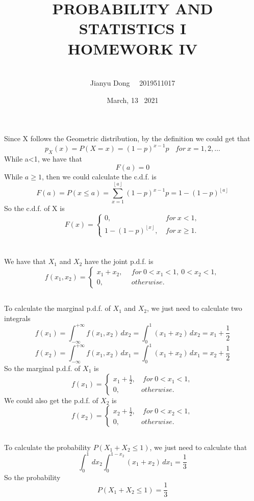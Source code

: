 \documentclass[10.5pt]{article}
\title{PROBABILITY AND STATISTICS I
\\HOMEWORK IV}
\author{\\Jianyu Dong   ~~2019511017}
\date{March, 13~ 2021}
\begin{document}
\maketitle
\newpage

\section{}
Since X follows the Geometric distribution, by the definition we could get that $$p_X(x) = P(X=x) = \left(1-p\right)^{x-1}p ~~~~for~x=1,2,\dots$$\indent
While a<1, we have that $$F(a) = 0$$\indent
While $a\geqslant 1$, then we could calculate the c.d.f. is $$F(a) = P(x\leqslant a) = \sum_{x=1}^{\left\lfloor a\right\rfloor } \left(1-p\right)^{x-1}p = 1-\left(1-p\right)^{\left\lfloor a\right\rfloor} $$\indent
So the c.d.f. of X is $$F(x) = \begin{cases}
    0, & ~for ~x<1,\\
    1-\left(1-p\right)^{\left\lfloor x\right\rfloor }, & ~for ~x\geqslant 1.
\end{cases}$$

\section{}
We have that $X_1$ and $X_2$ have the joint p.d.f. is $$f(x_1,x_2) = \begin{cases}
    x_1 + x_2,&~~for ~0<x_1<1,~0<x_2<1,\\
    0,&~~otherwise.
\end{cases}$$
\subsection{}
To calculate the marginal p.d.f. of $X_1$ and $X_2$, we just need to calculate two integrals $$f(x_1) = \int_{-\infty}^{+\infty} f(x_1,x_2) \,dx_2 = \int_0^1 \left(x_1+x_2\right) \,dx_2 = x_1 + \frac{1}{2}$$ $$f(x_2) = \int_{-\infty}^{+\infty} f(x_1,x_2) \,dx_1 = \int_0^1 \left(x_1+x_2\right) \,dx_1 = x_2 + \frac{1}{2}$$\indent
So the marginal p.d.f. of $X_1$ is $$f(x_1) = \begin{cases}
     x_1 +\frac{1}{2},&~for~0<x_1<1,\\
     0, &otherwise.
\end{cases}$$\indent
We could also get the p.d.f. of $X_2$ is $$f(x_2) = \begin{cases}
    x_2 +\frac{1}{2},&~for~0<x_2<1,\\
    0, &otherwise.
\end{cases}$$
\subsection{}
To calculate the probability $P(X_1+X_2 \leqslant 1)$, we just need to calculate that $$\int_0^1 \,dx_2 \int_0^{1-x_2} (x_1 + x_2) \,dx_1 = \frac{1}{3}$$\indent
So the probability $$P(X_1+X_2 \leqslant 1) = \frac{1}{3}$$\indent
\end{document}
